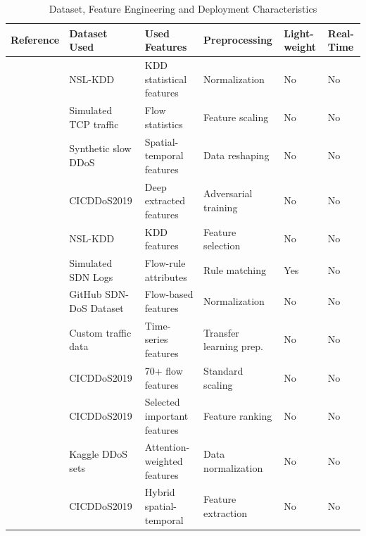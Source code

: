 \documentclass[ASNA,twocolumn]{USG} %
\begin{document}
\begin{table}[htb!]
\centering
\caption{Dataset, Feature Engineering and Deployment Characteristics}
\label{tab:comparison1b}
\renewcommand{\arraystretch}{1.2}
\begin{tabular}{|p{2.2cm}|p{3.1cm}|p{3.5cm}|p{3.6cm}|p{1cm}|p{1cm}|}
\hline
\textbf{Reference} & \textbf{Dataset Used} & \textbf{Used Features} & \textbf{Preprocessing} & \textbf{Light- weight} & \textbf{Real-Time} \\
\hline

\cite{tan2020new} & NSL-KDD & KDD statistical features & Normalization & No & No\\
\hline

\cite{khashab2021ddos} & Simulated TCP traffic & Flow statistics & Feature scaling & No & No \\
\hline

\cite{nugraha2020deep} & Synthetic slow DDoS & Spatial-temporal features & Data reshaping & No& No\\
\hline

\cite{novaes2021adversarial} & CICDDoS2019 & Deep extracted features & Adversarial training & No & No \\
\hline

\cite{nadeem2022ddos} & NSL-KDD & KDD features & Feature selection & No & No\\
\hline

\cite{bhayo2021time} & Simulated SDN Logs & Flow-rule attributes & Rule matching & Yes  & No\\
\hline

\cite{gadze2021investigation} & GitHub SDN-DoS Dataset & Flow-based features & Normalization & No & No \\
\hline

\cite{polat2022novel} & Custom traffic data & Time-series features & Transfer learning prep. & No & No \\
\hline

\cite{elubeyd2023hybrid} & CICDDoS2019 & 70+ flow features & Standard scaling & No & No \\
\hline

\cite{fan2021detection} & CICDDoS2019 & Selected important features & Feature ranking & No & No \\
\hline

\cite{priyadarshini2023sdn} & Kaggle DDoS sets & Attention-weighted features & Data normalization & No & No \\
\hline

\cite{shaheed2024hybrid} & CICDDoS2019 & Hybrid spatial-temporal & Feature extraction & No & No\\
\hline


\end{tabular}
\end{table}
\end{document}
